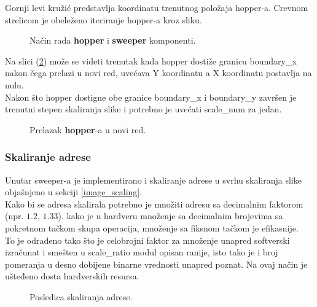 Gornji levi kružić predstavlja koordinatu trenutnog položaja hopper-a.
Crevnom strelicom je obeleženo iteriranje hopper-a kroz sliku. \\

\begin{figure}[H]
  \centering
    \resizebox{\textwidth}{!}{%
    
    
    }
\caption{Način rada \textbf{hopper} i \textbf{sweeper} komponenti.}
\label{hop_sweep1}
\end{figure}

Na slici (\ref{hop_sweep2}) može se videti trenutak kada hopper dostiže granicu
boundary\_x nakon čega prelazi u novi red, uvećava Y koordinatu a X koordinatu
postavlja na nulu. \\

Nakon što hopper dostigne obe granice boundary\_x i boundary\_y završen je
trenutni stepen skaliranja slike i potrebno je uvećati scale\_num za jedan.

\begin{figure}[H]
  \centering
  \resizebox{\textwidth}{!}{%
    
    
    }
\caption{Prelazak \textbf{hopper}-a u novi red.}
\label{hop_sweep2}
\end{figure}

\subsubsection{Skaliranje adrese}\label{address_scaling_sec}

Unutar sweeper-a je implementirano i skaliranje adrese u svrhu skaliranja slike
objašnjeno u sekciji \ref{image_scaling}. \\
Kako bi se adresa skalirala potrebno je množiti adresu sa decimalnim faktorom (npr. $1.2$, $1.33$).
kako je u hardveru množenje sa decimalnim brojevima sa pokretnom tačkom skupa operacija,
množenje sa fiksnom tačkom je efikasnije. \\
To je odrađeno tako što je celobrojni faktor za množenje unapred softverski izračunat i smešten
u scale\_ratio modul opisan ranije, isto tako je i broj pomeranja u desno dobijene binarne
vrednosti unapred poznat.
Na ovaj način je ušteđeno dosta hardverskih resursa. \\


\begin{figure}[H]
  \centering
  \resizebox{.4\textwidth}{!}{%
    
  }
  \caption{Posledica skaliranja adrese.}
  \label{hop_sweep_scale}
\end{figure}

